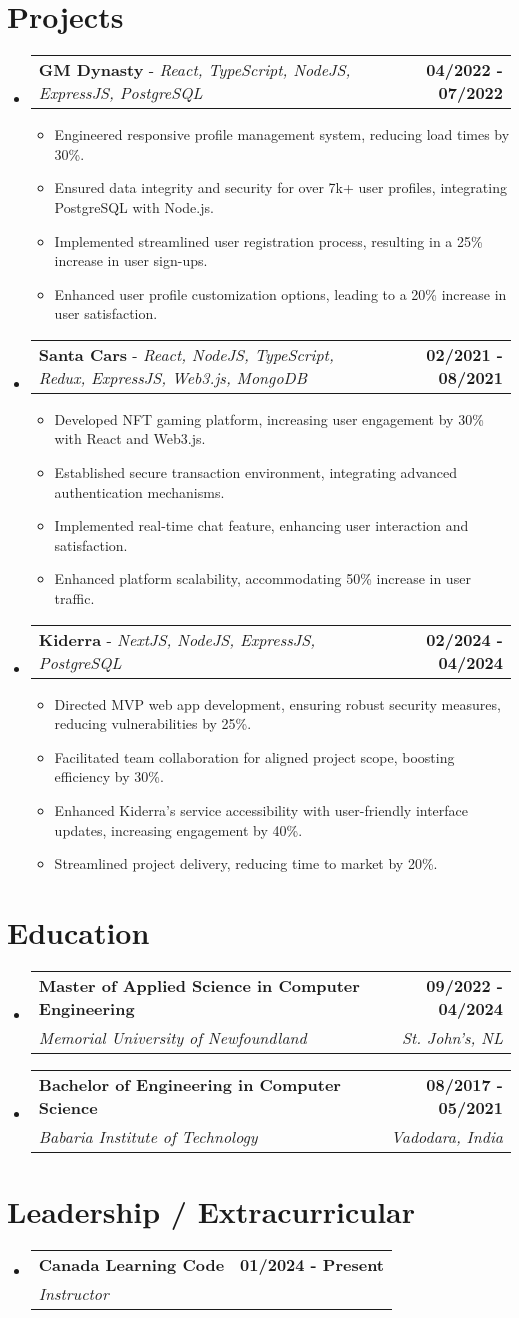 \documentclass[letterpaper,11pt]{article}
\makeatletter
\newcommand{\resumeItem}[1]{
  \item\small{
    {#1 \vspace{-2pt}}
  }
}
\newcommand{\resumeSubheading}[4]{
  \vspace{-2pt}\item
    \begin{tabular*}{1.0\textwidth}[t]{l@{\extracolsep{\fill}}r}
      \textbf{#1} & \textbf{\small #2} \\
      \textit{\small#3} & \textit{\small #4} \\
    \end{tabular*}\vspace{-7pt}
}
\newcommand{\resumeProjectHeading}[2]{
    \item
    \begin{tabular*}{1.001\textwidth}{l@{\extracolsep{\fill}}r}
      \small#1 & \textbf{\small #2}\\
    \end{tabular*}\vspace{-7pt}
}
\newcommand{\resumeSubHeadingListStart}{\begin{itemize}[leftmargin=0.0in, label={}]}
\newcommand{\resumeSubHeadingListEnd}{\end{itemize}}
\newcommand{\resumeItemListStart}{\begin{itemize}}
\newcommand{\resumeItemListEnd}{\end{itemize}\vspace{-5pt}}
\makeatother
\begin{document}
\section{Projects}
  \resumeSubHeadingListStart
    \resumeProjectHeading
        {\textbf{GM Dynasty} - \emph{React, TypeScript, NodeJS, ExpressJS, PostgreSQL}}{04/2022 - 07/2022}
        \resumeItemListStart
          \resumeItem{Engineered responsive profile management system, reducing load times by 30\%.}
          \resumeItem{Ensured data integrity and security for over 7k+ user profiles, integrating PostgreSQL with Node.js.}
          \resumeItem{Implemented streamlined user registration process, resulting in a 25\% increase in user sign-ups.}
          \resumeItem{Enhanced user profile customization options, leading to a 20\% increase in user satisfaction.}
        \resumeItemListEnd
        \vspace{-16pt}
    \resumeProjectHeading
        {\textbf{Santa Cars} - \emph{React, NodeJS, TypeScript, Redux, ExpressJS, Web3.js, MongoDB}}{02/2021 - 08/2021}
        \resumeItemListStart
          \resumeItem{Developed NFT gaming platform, increasing user engagement by 30\% with React and Web3.js.}
          \resumeItem{Established secure transaction environment, integrating advanced authentication mechanisms.}
          \resumeItem{Implemented real-time chat feature, enhancing user interaction and satisfaction.}
          \resumeItem{Enhanced platform scalability, accommodating 50\% increase in user traffic.}
        \resumeItemListEnd
                \vspace{-16pt}
    \resumeProjectHeading
        {\textbf{Kiderra} - \emph{NextJS, NodeJS, ExpressJS, PostgreSQL}}{02/2024 - 04/2024}
        \resumeItemListStart
          \resumeItem{Directed MVP web app development, ensuring robust security measures, reducing vulnerabilities by 25\%.}
          \resumeItem{Facilitated team collaboration for aligned project scope, boosting efficiency by 30\%.}
          \resumeItem{Enhanced Kiderra's service accessibility with user-friendly interface updates, increasing engagement by 40\%.}
          \resumeItem{Streamlined project delivery, reducing time to market by 20\%.}
        \resumeItemListEnd
  \resumeSubHeadingListEnd
\vspace{-15pt}

\section{Education}
\resumeSubHeadingListStart
\resumeSubheading
{Master of Applied Science in Computer Engineering}{09/2022 - 04/2024}
{Memorial University of Newfoundland}{St. John's, NL}
\resumeSubheading
{Bachelor of Engineering in Computer Science}{08/2017 - 05/2021}
{Babaria Institute of Technology}{Vadodara, India}
\resumeSubHeadingListEnd
\section{Leadership / Extracurricular}
    \resumeSubHeadingListStart
        \resumeSubheading{Canada Learning Code}{01/2024 - Present}{Instructor}{}
    \resumeSubHeadingListEnd
\end{document}
